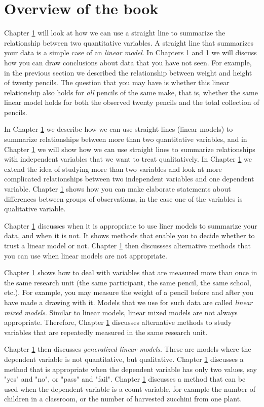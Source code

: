 \documentclass[]{report}\usepackage[]{graphicx}\usepackage[]{color}
\begin{document}
\section{Overview of the book}

Chapter \ref{} will look at how we can use a straight line to summarize the relationship between two quantitative variables. A straight line that summarizes your data is a simple case of an \textit{linear model}. In Chapters \ref{} and \ref{} we will discuss how you can draw conclusions about data that you have not seen. For example, in the previous section we described the relationship between weight and height of twenty pencils. The question that you may have is whether this linear relationship also holds for \textit{all} pencils of the same make, that is, whether the same linear model holds for both the observed twenty pencils and the total collection of pencils.

In Chapter \ref{} we describe how we can use straight lines (linear models) to summarize relationships between more than two quantitative variables, and in Chapter \ref{} we will show how we can use straight lines to summarize relationships with independent variables that we want to treat qualitatively. In Chapter \ref{} we extend the idea of studying more than two variables and look at more complicated relationships between two independent variables and one dependent variable. Chapter \ref{} shows how you can make elaborate statements about differences between groups of observations, in the case one of the variables is qualitative variable. 


Chapter \ref{} discusses when it is appropriate to use liner models to summarize your data, and when it is not. It shows methods that enable you to decide whether to trust a linear model or not. Chapter \ref{} then discussses alternative methods that you can use when linear models are not appropriate. 

Chapter \ref{} shows how to deal with variables that are measured more than once in the same research unit (the same participant, the same pencil, the same school, etc.). For example, you may measure the weight of a pencil before and after you have made a drawing with it. Models that we use for such data are called \textit{linear mixed models}. Similar to linear models, linear mixed models are not always appropriate. Therefore, Chapter \ref{} discusses alternative methods to study variables that are repeatedly measured in the same research unit. 

Chapter \ref{} then discusses \textit{generalized linear models}. These are models where the dependent variable is not quantitative, but qualitative. Chapter \ref{} discusses a method that is appropriate when the dependent variable has only two values, say "yes" and "no", or "pass" and "fail". Chapter \ref{} discusses a method that can be used when the dependent variable is a count variable, for example the number of children in a classroom, or the number of harvested zucchini from one plant. 
\end{document}
